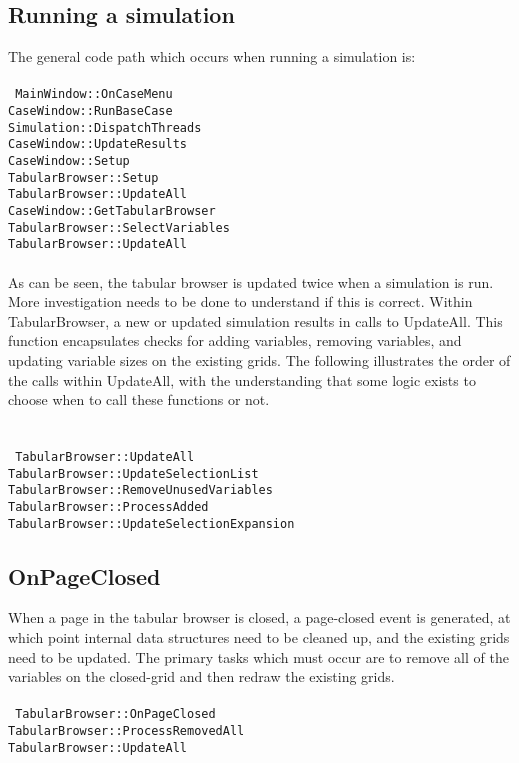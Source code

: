 \documentclass[11pt]{article} %
\begin{document}
\subsection{Running a simulation}
The general code path which occurs when running a simulation is:\\
\\
\texttt{
MainWindow::OnCaseMenu \\
\indent CaseWindow::RunBaseCase \\
 \indent \indent	Simulation::DispatchThreads \\
 \indent \indent		CaseWindow::UpdateResults \\
 \indent \indent \indent			CaseWindow::Setup \\
 \indent \indent \indent \indent			TabularBrowser::Setup \\
 \indent \indent \indent \indent \indent				TabularBrowser::UpdateAll \\
 \indent \indent \indent			CaseWindow::GetTabularBrowser \\
 \indent \indent \indent \indent				TabularBrowser::SelectVariables \\
 \indent \indent \indent \indent \indent					TabularBrowser::UpdateAll \\
}
\\
As can be seen, the tabular browser is updated twice when a simulation is run.  More investigation needs to be done to understand if this is correct. Within TabularBrowser, a new or updated simulation results in calls to UpdateAll.  This function encapsulates checks for adding variables, removing variables, and updating variable sizes on the existing grids. The following illustrates the order of the calls within UpdateAll, with the understanding that some logic exists to choose when to call these functions or not.  \\
\\
\\
\texttt{
TabularBrowser::UpdateAll \\
\indent TabularBrowser::UpdateSelectionList \\
\indent TabularBrowser::RemoveUnusedVariables \\
\indent TabularBrowser::ProcessAdded \\
\indent TabularBrowser::UpdateSelectionExpansion \\
}
\subsection{OnPageClosed}
When a page in the tabular browser is closed, a page-closed event is generated, at which point internal data structures need to be cleaned up, and the existing grids need to be updated. The primary tasks which must occur are to remove all of the variables on the closed-grid and then redraw the existing grids.\\
\\
\texttt{
TabularBrowser::OnPageClosed \\
\indent TabularBrowser::ProcessRemovedAll \\
\indent TabularBrowser::UpdateAll
}
\end{document}
